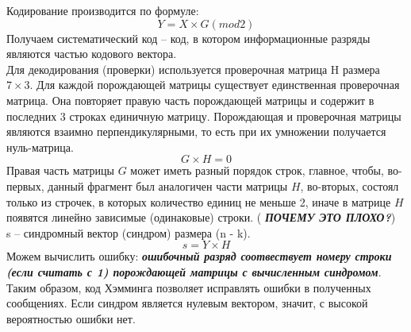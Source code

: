 \documentclass[a5paper, 10pt]{article}
\theoremstyle{definition}
\theoremstyle{plain}
\theoremstyle{remark}
\begin{document}
Кодирование производится по формуле:
\begin{equation}
Y = X \times G  (mod 2)
\end{equation}
Получаем систематический код -- код, в котором информационные разряды являются частью кодового вектора.\\

Для декодирования (проверки) используется проверочная матрица H размера $7 \times 3$. Для каждой порождающей матрицы существует единственная проверочная матрица. Она повторяет правую часть порождающей матрицы и содержит в последних 3 строках единичную матрицу. Порождающая и проверочная матрицы являются взаимно перпендикулярными, то есть при их умножении получается нуль-матрица.
\begin{equation}
G \times H  = 0
\end{equation}
Правая часть матрицы $G$ может иметь разный порядок строк, главное, чтобы, во-первых, данный фрагмент был аналогичен части матрицы $H$, во-вторых, состоял только из строчек, в которых количество единиц не меньше 2, иначе в матрице $H$ появятся линейно зависимые (одинаковые) строки. ( \textbf{\textit{ПОЧЕМУ ЭТО ПЛОХО?}})\\
s -- синдромный вектор (синдром) размера (n - k).
\begin{equation}
s = Y \times H
\end{equation}
Можем вычислить ошибку:  \textbf{\textit{ошибочный разряд соотвествует номеру строки (если считать с 1) порождающей матрицы с вычисленным синдромом}}. Таким образом, код Хэмминга позволяет исправлять ошибки в полученных сообщениях. Если синдром является нулевым вектором, значит, с высокой вероятностью ошибки нет.
\end{document}
